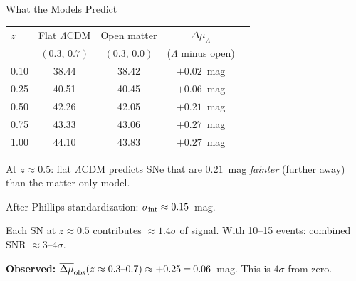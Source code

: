 \documentclass[aspectratio=169]{beamer}
\begin{document}
\begin{frame}{What the Models Predict}

\begin{center}
\begin{tabular}{lcccc}
\toprule
$z$ & Flat $\Lambda$CDM & Open matter & $\Delta\mu_\Lambda$ \\
    & $(0.3,\,0.7)$ & $(0.3,\,0.0)$ & ($\Lambda$ minus open) \\
\midrule
0.10 & 38.44 & 38.42 & $+0.02$~mag \\
0.25 & 40.51 & 40.45 & $+0.06$~mag \\
0.50 & 42.26 & 42.05 & $+0.21$~mag \\
0.75 & 43.33 & 43.06 & $+0.27$~mag \\
1.00 & 44.10 & 43.83 & $+0.27$~mag \\
\bottomrule
\end{tabular}
\end{center}

\medskip
At $z \approx 0.5$: flat $\Lambda$CDM predicts SNe that are $0.21$~mag
\emph{fainter} (further away) than the matter-only model.

\medskip
After Phillips standardization: $\sigma_{\rm int} \approx 0.15$~mag.

\medskip
Each SN at $z \approx 0.5$ contributes $\approx 1.4\sigma$ of signal.
With 10--15 events: combined SNR $\approx 3$--$4\sigma$.

\medskip
\textbf{Observed:} $\overline{\Delta\mu}_{\rm obs}(z \approx 0.3\text{--}0.7)
\approx +0.25 \pm 0.06$~mag.  This is $4\sigma$ from zero.

\end{frame}
\end{document}
